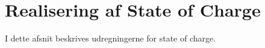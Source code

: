 \section{Realisering af State of Charge}
I dette afsnit beskrives udregningerne for state of charge. 
